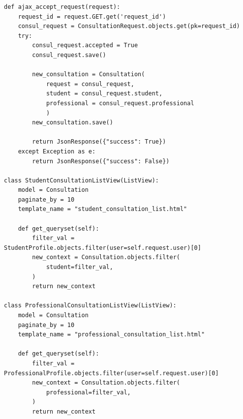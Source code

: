 \documentclass{article}
\begin{document}
\begin{verbatim}
def ajax_accept_request(request):
	request_id = request.GET.get('request_id')
	consul_request = ConsultationRequest.objects.get(pk=request_id)
	try:
		consul_request.accepted = True
		consul_request.save()
		
		new_consultation = Consultation(
			request = consul_request,
			student = consul_request.student,
			professional = consul_request.professional
			)
		new_consultation.save()

		return JsonResponse({"success": True})
	except Exception as e:
		return JsonResponse({"success": False})

class StudentConsultationListView(ListView):
	model = Consultation
	paginate_by = 10
	template_name = "student_consultation_list.html"

	def get_queryset(self):
		filter_val = StudentProfile.objects.filter(user=self.request.user)[0]
		new_context = Consultation.objects.filter(
			student=filter_val,
		)
		return new_context

class ProfessionalConsultationListView(ListView):
	model = Consultation
	paginate_by = 10
	template_name = "professional_consultation_list.html"

	def get_queryset(self):
		filter_val = ProfessionalProfile.objects.filter(user=self.request.user)[0]
		new_context = Consultation.objects.filter(
			professional=filter_val,
		)
		return new_context
	\end{verbatim}

	\newpage
\end{document}
